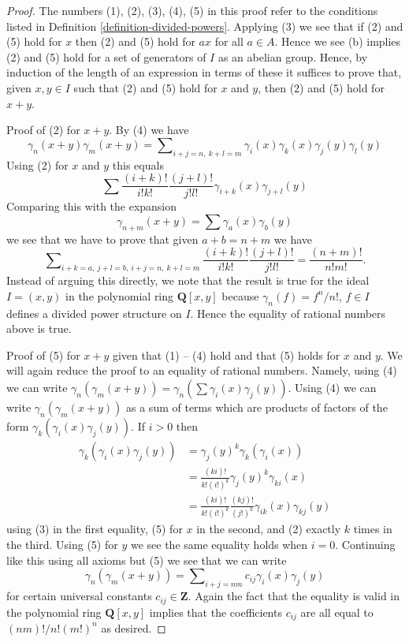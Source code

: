 \begin{proof}
The numbers (1), (2), (3), (4), (5) in this proof refer to the
conditions listed in Definition \ref{definition-divided-powers}.
Applying (3) we see that if (2) and (5) hold for $x$ then (2) and (5)
hold for $ax$ for all $a \in A$. Hence we see (b) implies
(2) and (5) hold for a set of generators
of $I$ as an abelian group. Hence, by induction of the length
of an expression in terms of these it suffices to prove that, given
$x, y \in I$ such that (2) and (5) hold for $x$ and $y$, then (2) and (5) hold
for $x + y$.

\medskip\noindent
Proof of (2) for $x + y$. By (4) we have
$$
\gamma_n(x + y)\gamma_m(x + y) =
\sum\nolimits_{i + j = n,\ k + l = m}
\gamma_i(x)\gamma_k(x)\gamma_j(y)\gamma_l(y)
$$
Using (2) for $x$ and $y$ this equals
$$
\sum \frac{(i + k)!}{i!k!}\frac{(j + l)!}{j!l!}
\gamma_{i + k}(x)\gamma_{j + l}(y)
$$
Comparing this with the expansion
$$
\gamma_{n + m}(x + y) = \sum \gamma_a(x)\gamma_b(y)
$$
we see that we have to prove that given $a + b = n + m$ we have
$$
\sum\nolimits_{i + k = a,\ j + l = b,\ i + j = n,\ k + l = m}
\frac{(i + k)!}{i!k!}\frac{(j + l)!}{j!l!}
=
\frac{(n + m)!}{n!m!}.
$$
Instead of arguing this directly, we note that the result is true
for the ideal $I = (x, y)$ in the polynomial ring $\mathbf{Q}[x, y]$
because $\gamma_n(f) = f^n/n!$, $f \in I$ defines a divided power
structure on $I$. Hence the equality of rational numbers above is true.

\medskip\noindent
Proof of (5) for $x + y$ given that (1) -- (4) hold and that (5)
holds for $x$ and $y$. We will again reduce the proof to an equality
of rational numbers. Namely, using (4) we can write
$\gamma_n(\gamma_m(x + y)) = \gamma_n(\sum \gamma_i(x)\gamma_j(y))$.
Using (4) we can write
$\gamma_n(\gamma_m(x + y))$ as a sum of terms which are products of
factors of the form $\gamma_k(\gamma_i(x)\gamma_j(y))$.
If $i > 0$ then
\begin{align*}
\gamma_k(\gamma_i(x)\gamma_j(y)) & =
\gamma_j(y)^k\gamma_k(\gamma_i(x)) \\
& = \frac{(ki)!}{k!(i!)^k} \gamma_j(y)^k \gamma_{ki}(x) \\
& =
\frac{(ki)!}{k!(i!)^k} \frac{(kj)!}{(j!)^k} \gamma_{ik}(x) \gamma_{kj}(y)
\end{align*}
using (3) in the first equality, (5) for $x$ in the second, and
(2) exactly $k$ times in the third. Using (5) for $y$ we see the
same equality holds when $i = 0$. Continuing like this using all
axioms but (5) we see that we can write
$$
\gamma_n(\gamma_m(x + y)) =
\sum\nolimits_{i + j = nm} c_{ij}\gamma_i(x)\gamma_j(y)
$$
for certain universal constants $c_{ij} \in \mathbf{Z}$. Again the fact
that the equality is valid in the polynomial ring $\mathbf{Q}[x, y]$
implies that the coefficients $c_{ij}$ are all equal to $(nm)!/n!(m!)^n$
as desired.
\end{proof}

